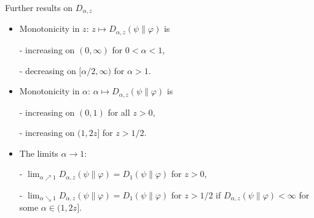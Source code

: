 \documentclass[mathserif]{beamer}
\newcommand{\<}{\langle}
\renewcommand{\>}{\rangle}
\begin{document}
\begin{frame}{Further results on $D_{\alpha,z}$}

\begin{itemize}
\item Monotonicity in $z$: $z\mapsto D_{\alpha,z}(\psi\|\varphi)$ is
\medskip

- increasing on $(0,\infty)$ for $0<\alpha<1$,

- decreasing on $[\alpha/2,\infty)$ for $\alpha>1$.
\medskip

\item Monotonicity in $\alpha$: $\alpha\mapsto D_{\alpha,z}(\psi\|\varphi)$ is
\medskip

- increasing on $(0,1)$ for all $z>0$,

- increasing on $(1,2z]$ for $z>1/2$.

\medskip
\item The limits $\alpha\to1$: 
\medskip

- $\lim_{\alpha\nearrow 1} D_{\alpha,z}(\psi\|\varphi)= D_1(\psi\|\varphi)$ for $z>0$,

\medskip
- $\lim_{\alpha\searrow 1} D_{\alpha,z}(\psi\|\varphi)= D_1(\psi\|\varphi)$ for $z>1/2$ if
\vskip 2mm
$D_{\alpha,z}(\psi\|\varphi)<\infty$ for some $\alpha\in (1,2z]$.




\end{itemize}


\end{frame}


\begin{frame}{}









\end{frame}
\end{document}
